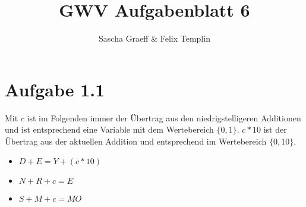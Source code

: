 \documentclass[a4paper,10pt]{article}
\title{GWV Aufgabenblatt 6}
\author{Sascha Graeff \& Felix Templin}
\begin{document}
\maketitle

\section*{Aufgabe 1.1}
Mit $c$ ist im Folgenden immer der Übertrag aus den niedrigstelligeren Additionen und ist entsprechend eine Variable mit dem Wertebereich $\{0,1\}$. $c*10$ ist der Übertrag aus der aktuellen Addition und entsprechend im Wertebereich $\{0,10\}$.
\begin{itemize}
  \item $D + E = Y + (c*10)$
  \item $N + R + c = E$
  \item $S + M + c = MO$
\end{itemize}
\end{document}
